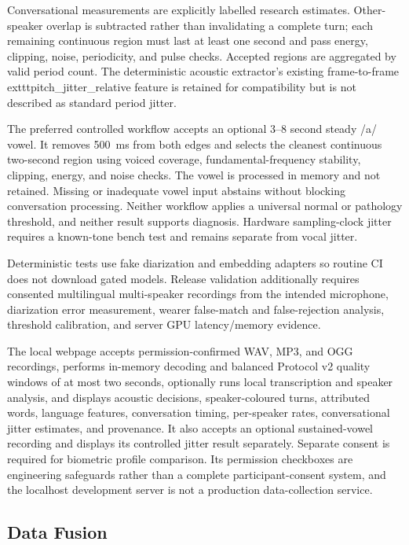 Conversational measurements are explicitly labelled research estimates. Other-speaker overlap is subtracted rather than invalidating a complete turn; each remaining continuous region must last at least one second and pass energy, clipping, noise, periodicity, and pulse checks. Accepted regions are aggregated by valid period count. The deterministic acoustic extractor's existing frame-to-frame 	exttt{pitch\_jitter\_relative} feature is retained for compatibility but is not described as standard period jitter.

The preferred controlled workflow accepts an optional 3--8 second steady /a/ vowel. It removes 500~ms from both edges and selects the cleanest continuous two-second region using voiced coverage, fundamental-frequency stability, clipping, energy, and noise checks. The vowel is processed in memory and not retained. Missing or inadequate vowel input abstains without blocking conversation processing. Neither workflow applies a universal normal or pathology threshold, and neither result supports diagnosis. Hardware sampling-clock jitter requires a known-tone bench test and remains separate from vocal jitter.

Deterministic tests use fake diarization and embedding adapters so routine CI does not download gated models. Release validation additionally requires consented multilingual multi-speaker recordings from the intended microphone, diarization error measurement, wearer false-match and false-rejection analysis, threshold calibration, and server GPU latency/memory evidence.

The local webpage accepts permission-confirmed WAV, MP3, and OGG recordings, performs in-memory decoding and balanced Protocol v2 quality windows of at most two seconds, optionally runs local transcription and speaker analysis, and displays acoustic decisions, speaker-coloured turns, attributed words, language features, conversation timing, per-speaker rates, conversational jitter estimates, and provenance. It also accepts an optional sustained-vowel recording and displays its controlled jitter result separately. Separate consent is required for biometric profile comparison. Its permission checkboxes are engineering safeguards rather than a complete participant-consent system, and the localhost development server is not a production data-collection service.

\subsection{Data Fusion}
\label{sec:data-fusion-ai}

